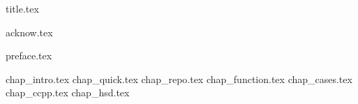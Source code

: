 \documentclass[12pt,letterpaper,oneside]{scrbook}
\begin{document}
\frontmatter
{title.tex}

\clearpage
\thispagestyle{empty}
{acknow.tex}
 
\tableofcontents

{preface.tex}

\mainmatter

{chap_intro.tex}
{chap_quick.tex}
{chap_repo.tex}
{chap_function.tex}
{chap_cases.tex}
{chap_ccpp.tex}
{chap_hsd.tex}
\backmatter
\end{document}
